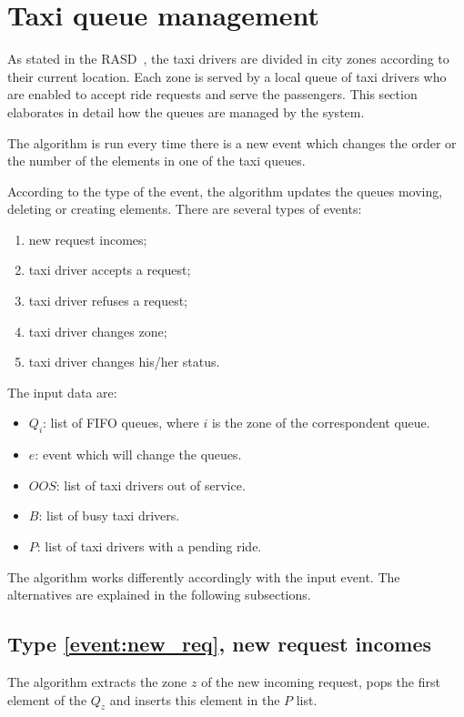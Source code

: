 \section{Taxi queue management}
As stated in the RASD~\cite{rasd}, the taxi drivers are divided in city zones according to their current location. Each zone is served by a local queue of taxi drivers who are enabled to accept ride requests and serve the passengers. This section elaborates in detail how the queues are managed by the system.

The algorithm is run every time there is a new event which changes the order or the number of the elements in one of the taxi queues.

According to the type of the event, the algorithm updates the queues moving, deleting or creating elements. There are several types of events:
\begin{enumerate}
	\item new request incomes; \label{event:new_req}
	\item taxi driver accepts a request; \label{event:accepted_req}
	\item taxi driver refuses a request; \label{event:refuses_req}
	\item taxi driver changes zone; \label{event:changed_zone}
	\item taxi driver changes his/her status. \label{event:changed_status}
\end{enumerate}
The input data are:
\begin{itemize}
	\item $Q_i$: list of FIFO queues, where $i$ is the zone of the correspondent queue.
	\item $e$: event which will change the queues.
	\item $OOS$: list of taxi drivers out of service.
	\item $B$: list of busy taxi drivers.
	\item $P$: list of taxi drivers with a pending ride.
\end{itemize}

The algorithm works differently accordingly with the input event. The alternatives are explained in the following subsections.

\subsection{Type \ref{event:new_req}, new request incomes}
The algorithm extracts the zone $z$ of the new incoming request, pops the first element of the $Q_z$ and inserts this element in the $P$ list.

